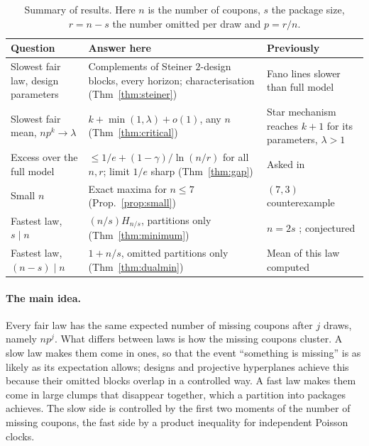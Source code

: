 \documentclass[11pt,a4paper]{article}
\theoremstyle{remark}
\begin{document}
\begin{table}[t]
\centering
\small
\begin{tabular}{@{}>{\raggedright\arraybackslash}p{3.3cm}>{\raggedright\arraybackslash}p{6.1cm}>{\raggedright\arraybackslash}p{3.6cm}@{}}
\toprule
Question & Answer here & Previously \\
\midrule
Slowest fair law, design parameters & Complements of Steiner $2$-design blocks, every horizon; characterisation (Thm~\ref{thm:steiner}) & Fano lines slower than full model \cite{barak} \\
Slowest fair mean, $np^k\to\lambda$ & $k+\min(1,\lambda)+o(1)$, any $n$ (Thm~\ref{thm:critical}) & Star mechanism reaches $k+1$ for its parameters, $\lambda>1$ \cite{barak} \\
Excess over the full model & $\le 1/e+(1-\gamma)/\ln(n/r)$ for all $n,r$; limit $1/e$ sharp (Thm~\ref{thm:gap}) & Asked in \cite{barak} \\
Small $n$ & Exact maxima for $n\le7$ (Prop.~\ref{prop:small}) & $(7,3)$ counterexample \cite{barak} \\
Fastest law, $s\mid n$ & $(n/s)H_{n/s}$, partitions only (Thm~\ref{thm:minimum}) & $n=2s$ \cite{fang}; conjectured \cite{fang,sher} \\
Fastest law, $(n-s)\mid n$ & $1+n/s$, omitted partitions only (Thm~\ref{thm:dualmin}) & Mean of this law computed \cite{sher} \\
\bottomrule
\end{tabular}
\caption{Summary of results. Here $n$ is the number of coupons, $s$ the package size, $r=n-s$ the number omitted per draw and $p=r/n$.}
\label{tab:results}
\end{table}

\paragraph{The main idea.} Every fair law has the same expected number of missing coupons after $j$ draws, namely $np^j$. What differs between laws is how the missing coupons cluster. A slow law makes them come in ones, so that the event ``something is missing'' is as likely as its expectation allows; designs and projective hyperplanes achieve this because their omitted blocks overlap in a controlled way. A fast law makes them come in large clumps that disappear together, which a partition into packages achieves. The slow side is controlled by the first two moments of the number of missing coupons, the fast side by a product inequality for independent Poisson clocks.
\end{document}
